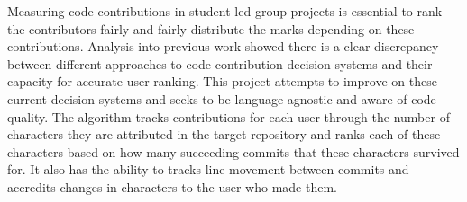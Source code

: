 Measuring code contributions in student-led group projects is essential to rank the contributors fairly and fairly distribute the marks depending on these contributions. Analysis into previous work showed there is a clear discrepancy between different approaches to code contribution decision systems and their capacity for accurate user ranking. This project attempts to improve on these current decision systems and seeks to be language agnostic and aware of code quality. The algorithm tracks contributions for each user through the number of characters they are attributed in the target repository and ranks each of these characters based on how many succeeding commits that these characters survived for. It also has the ability to tracks line movement between commits and accredits changes in characters to the user who made them.

